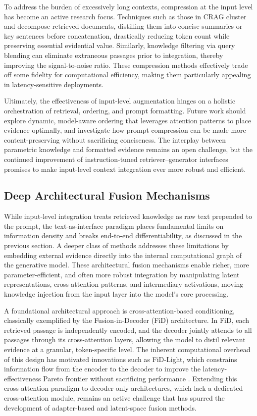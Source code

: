 \documentclass[11pt,a4paper]{article}
\begin{document}
To address the burden of excessively long contexts, compression at the input level has become an active research focus. Techniques such as those in CRAG \cite{arxiv:2401.15884v2} cluster and decompose retrieved documents, distilling them into concise summaries or key sentences before concatenation, drastically reducing token count while preserving essential evidential value. Similarly, knowledge filtering via query blending \cite{arxiv:2402.11129v1} can eliminate extraneous passages prior to integration, thereby improving the signal-to-noise ratio. These compression methods effectively trade off some fidelity for computational efficiency, making them particularly appealing in latency-sensitive deployments.

Ultimately, the effectiveness of input-level augmentation hinges on a holistic orchestration of retrieval, ordering, and prompt formatting. Future work should explore dynamic, model-aware ordering that leverages attention patterns to place evidence optimally, and investigate how prompt compression can be made more content-preserving without sacrificing conciseness. The interplay between parametric knowledge and formatted evidence remains an open challenge, but the continued improvement of instruction-tuned retriever--generator interfaces promises to make input-level context integration ever more robust and efficient.


\subsection{Deep Architectural Fusion Mechanisms}


While input-level integration treats retrieved knowledge as raw text prepended to the prompt, the text-as-interface paradigm places fundamental limits on information density and breaks end-to-end differentiability, as discussed in the previous section. A deeper class of methods addresses these limitations by embedding external evidence directly into the internal computational graph of the generative model. These architectural fusion mechanisms enable richer, more parameter-efficient, and often more robust integration by manipulating latent representations, cross-attention patterns, and intermediary activations, moving knowledge injection from the input layer into the model's core processing.

A foundational architectural approach is cross-attention-based conditioning, classically exemplified by the Fusion-in-Decoder (FiD) architecture. In FiD, each retrieved passage is independently encoded, and the decoder jointly attends to all passages through its cross-attention layers, allowing the model to distil relevant evidence at a granular, token-specific level. The inherent computational overhead of this design has motivated innovations such as FiD-Light, which constrains information flow from the encoder to the decoder to improve the latency-effectiveness Pareto frontier without sacrificing performance \cite{arxiv:2209.14290v1}. Extending this cross-attention paradigm to decoder-only architectures, which lack a dedicated cross-attention module, remains an active challenge that has spurred the development of adapter-based and latent-space fusion methods.
\end{document}
